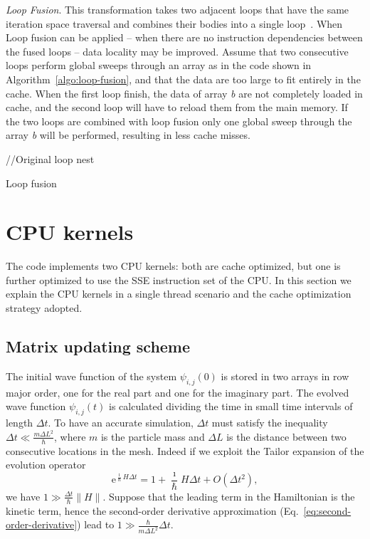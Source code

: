 \noindent \textit{Loop Fusion}. This transformation takes two adjacent loops that have the same iteration space traversal and combines their bodies into a single loop~\citep{Darte99onthe}.
When Loop fusion can be applied -- when there are no instruction dependencies between the fused loops -- data locality may be improved. Assume that two consecutive loops perform global sweeps through an array as in the code shown in Algorithm~\ref{algo:loop-fusion},
and that the data are too large to fit entirely in the cache. When the first loop finish, the data of array \textit{b} are not completely loaded in cache, and the second loop will have to reload them from the main memory. If the two loops are combined with loop fusion only one global sweep through the array \textit{b} will be performed, resulting in less cache misses. \\
\begin{algorithm}[h]
//Original loop nest\;
\SetAlgoLined
{}
\caption{Loop fusion} \label{algo:loop-fusion}
\end{algorithm}

\section{CPU kernels}
The code implements two CPU kernels: both are  cache optimized, but one is further optimized to use the SSE instruction set of the CPU. In this section we explain the CPU kernels in a single thread scenario and the cache optimization strategy adopted.

\subsection{Matrix updating scheme}
The initial wave function of the system $\psi_{i,j}(0)$ is stored in two arrays in row major order, one for the real part and one for the imaginary part. The evolved wave function $\psi_{i,j}(t)$ is calculated dividing the time in small time intervals of length $\Delta t$. To have an accurate simulation, $\Delta t$ must satisfy the inequality $\Delta t \ll \frac{m \Delta L^2}{\hbar}$, where $m$ is the particle mass and $\Delta L$ is the distance between two consecutive locations in the mesh. Indeed if we exploit the Tailor expansion of the evolution operator
\begin{equation}
\mathrm{e}^{\frac{\imath}{\hbar}H\Delta t} = 1 + \frac{\imath}{\hbar}H\Delta t + O(\Delta t^2),
\end{equation} 
we have $1 \gg \frac{\Delta t}{\hbar}\parallel H \parallel $. Suppose that the leading term in the Hamiltonian is the kinetic term, hence the second-order derivative approximation (Eq.~\eqref{eq:second-order-derivative}) lead to $1 \gg \frac{\hbar}{m \Delta L^2} \Delta t$.

